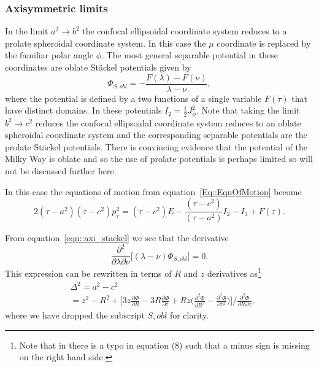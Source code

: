 \documentclass[useAMS,usenatbib,fleqn,a4paper]{mn2e}
\begin{document}
\subsubsection{Axisymmetric limits}
In the limit $a^2\rightarrow b^2$ the confocal ellipsoidal coordinate system reduces to a prolate spheroidal coordinate system. In this case the $\mu$ coordinate is replaced by the familiar polar angle $\phi$. The most general separable potential in these coordinates are oblate St\"ackel potentials given by
\begin{equation}
\Phi_{S,obl} = -\frac{F(\lambda)-F(\nu)}{\lambda-\nu},
\label{eqn::axi_stackel}
\end{equation}
where the potential is defined by a two functions of a single variable $F(\tau)$ that have distinct domains. In these potentials $I_2=\frac{1}{2}J_\phi^2$. Note that taking the limit $b^2 \rightarrow c^2$ reduces the confocal ellipsoidal coordinate system reduces to an oblate spheroidal coordinate system and the corresponding separable potentials are the prolate St\"ackel potentials. There is convincing evidence that the potential of the Milky Way is oblate and so the use of prolate potentials is perhaps limited so will not be discussed further here.

In this case the equations of motion from equation~\eqref{Eq::EqnOfMotion} become
\begin{equation}
2(\tau-a^2)(\tau-c^2)p_\tau^2=(\tau-c^2)E-\frac{(\tau-c^2)}{(\tau-a^2)}I_2-I_3+F(\tau).
\label{Eq::EqnOfMotionAxi}
\end{equation}

From equation~\eqref{eqn::axi_stackel} we see that the derivative
\[
\frac{\partial^2}{\partial\lambda\partial\nu}\Big[(\lambda-\nu)\Phi_{S,obl}\Big]=0.
\]
This expression can be rewritten in terms of $R$ and $z$ derivatives as\footnote{Note that in \cite{Sanders2012a} there is a typo in equation (8) such that a minus sign is missing on the right hand side.}
\begin{equation}
\begin{split}
&\Delta^2 = a^2-c^2 \\&= z^2-R^2+\Big[3z\frac{\partial \Phi}{\partial R}-3R\frac{\partial \Phi}{\partial z}+Rz\Big(\frac{\partial^2 \Phi}{\partial R^2}-\frac{\partial^2 \Phi}{\partial z^2}\Big)\Big]/\frac{\partial^2 \Phi}{\partial R\partial z},
\end{split}
\label{DeltaGuess}
\end{equation}
where we have dropped the subscript $S,obl$ for clarity.
\end{document}
